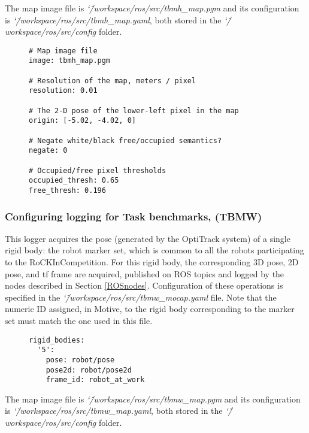 \documentclass[a4paper]{article}
\newcommand{\ro}{RoCKIn}
\newcommand{\srcdir}{\char`\~/workspace/ros/src/}
\begin{document}
The map image file is \emph{\srcdir tbmh\_map.pgm} and its configuration is \emph{\srcdir tbmh\_map.yaml}, both stored in the \emph{\srcdir config} folder.

\begin{figure}[h!]
	\noindent
	\begin{minipage}[t!]{\linewidth}
		\begin{lstlisting}[caption=tbmh\_map.yaml]
# Map image file
image: tbmh_map.pgm

# Resolution of the map, meters / pixel
resolution: 0.01

# The 2-D pose of the lower-left pixel in the map
origin: [-5.02, -4.02, 0]

# Negate white/black free/occupied semantics?
negate: 0

# Occupied/free pixel thresholds
occupied_thresh: 0.65
free_thresh: 0.196
		\end{lstlisting}
	\end{minipage}
\end{figure}

\clearpage

\subsubsection{Configuring logging for Task benchmarks, \ro@Work (TBMW)}
This logger acquires the pose (generated by the OptiTrack system) of a single rigid body: the robot marker set, which is common to all the robots participating to the \ro Competition. For this rigid body, the corresponding 3D pose, 2D pose, and tf frame are acquired, published on ROS topics and logged by the nodes described in Section \ref{ROSnodes}.
Configuration of these operations is specified in the \emph{\srcdir tbmw\_mocap.yaml} file. Note that the numeric ID assigned, in Motive, to the rigid body corresponding to the marker set must match the one used in this file.

\begin{figure}[h!]
	\noindent
	\begin{minipage}[t!]{\linewidth}
		\begin{lstlisting}[caption=tbmw\_mocap.yaml]
rigid_bodies:
  '5':
    pose: robot/pose
    pose2d: robot/pose2d
    frame_id: robot_at_work
		\end{lstlisting}
	\end{minipage}
\end{figure}

The map image file is \emph{\srcdir tbmw\_map.pgm} and its configuration is \emph{\srcdir tbmw\_map.yaml}, both stored in the \emph{\srcdir config} folder.
\end{document}
